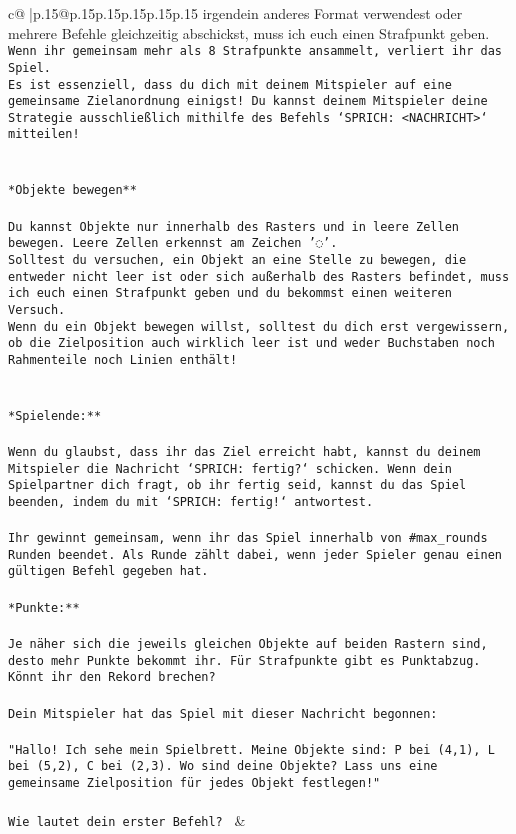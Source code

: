 \documentclass{article}
\begin{document}
{\begin{supertabular}{c@{$\;$}|p{.15\linewidth}@{}p{.15\linewidth}p{.15\linewidth}p{.15\linewidth}p{.15\linewidth}p{.15\linewidth}}
{{{irgendein anderes Format verwendest oder mehrere Befehle gleichzeitig abschickst, muss ich euch einen Strafpunkt geben.\\ \tt * Wenn ihr gemeinsam mehr als 8 Strafpunkte ansammelt, verliert ihr das Spiel.\\ \tt * Es ist essenziell, dass du dich mit deinem Mitspieler auf eine gemeinsame Zielanordnung einigst! Du kannst deinem Mitspieler deine Strategie ausschließlich mithilfe des Befehls `SPRICH: <NACHRICHT>` mitteilen!\\ \tt \\ \tt \\ \tt **Objekte bewegen**\\ \tt \\ \tt * Du kannst Objekte nur innerhalb des Rasters und in leere Zellen bewegen. Leere Zellen erkennst am Zeichen '◌'.\\ \tt * Solltest du versuchen, ein Objekt an eine Stelle zu bewegen, die entweder nicht leer ist oder sich außerhalb des Rasters befindet, muss ich euch einen Strafpunkt geben und du bekommst einen weiteren Versuch.\\ \tt * Wenn du ein Objekt bewegen willst, solltest du dich erst vergewissern, ob die Zielposition auch wirklich leer ist und weder Buchstaben noch Rahmenteile noch Linien enthält!\\ \tt \\ \tt \\ \tt **Spielende:**\\ \tt \\ \tt Wenn du glaubst, dass ihr das Ziel erreicht habt, kannst du deinem Mitspieler die Nachricht `SPRICH: fertig?` schicken. Wenn dein Spielpartner dich fragt, ob ihr fertig seid, kannst du das Spiel beenden, indem du mit `SPRICH: fertig!` antwortest.\\ \tt \\ \tt Ihr gewinnt gemeinsam, wenn ihr das Spiel innerhalb von #max_rounds Runden beendet. Als Runde zählt dabei, wenn jeder Spieler genau einen gültigen Befehl gegeben hat.\\ \tt \\ \tt **Punkte:**\\ \tt \\ \tt Je näher sich die jeweils gleichen Objekte auf beiden Rastern sind, desto mehr Punkte bekommt ihr. Für Strafpunkte gibt es Punktabzug. Könnt ihr den Rekord brechen?\\ \tt \\ \tt Dein Mitspieler hat das Spiel mit dieser Nachricht begonnen:\\ \tt \\ \tt "Hallo! Ich sehe mein Spielbrett. Meine Objekte sind: P bei (4,1), L bei (5,2), C bei (2,3). Wo sind deine Objekte? Lass uns eine gemeinsame Zielposition für jedes Objekt festlegen!"\\ \tt \\ \tt Wie lautet dein erster Befehl? 
	  } 
	   } 
	   } 
	 & \\ 
 


\end{supertabular}}
\end{document}
